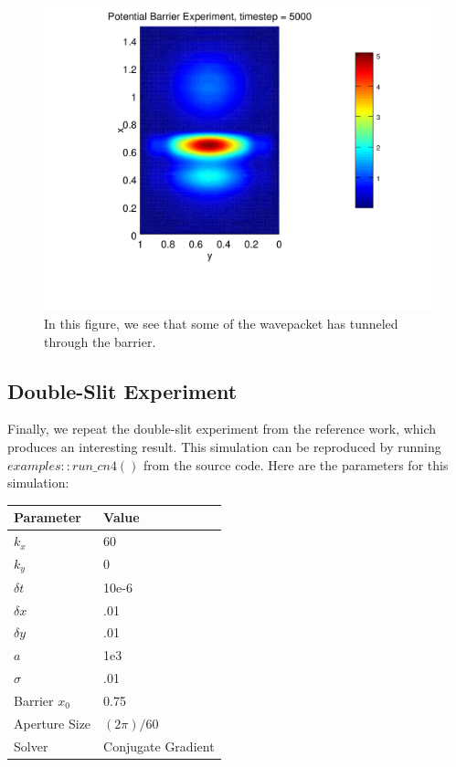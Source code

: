 \documentclass[letterpaper,12pt]{article}
\begin{document}
\begin{figure}[!htbp]
\centering
\includegraphics[scale=0.65,trim = 2mm 25mm 2mm 15mm]{barrier3.png}
\caption{In this figure, we see that some of the wavepacket has tunneled through the barrier.}
\label{fig:b3}
\end{figure}

\newpage
\subsection{Double-Slit Experiment}

Finally, we repeat the double-slit experiment from the reference work, which produces an interesting result.  This simulation can be reproduced by running $examples::run\_cn4()$ from the source code. Here are the parameters for this simulation:

\begin{center}
    \begin{tabular}{ | l | l  |}
    \hline
    Parameter & Value  \\ \hline
	$k_x$ & 60  \\ \hline
	$k_y$ & 0  \\ \hline    
	$\delta t$ & 10e-6  \\ \hline    
    $\delta x$ & .01  \\ \hline    
    $\delta y$ & .01  \\ \hline 
 	$a$ & 1e3  \\ \hline    
    $\sigma$ & .01  \\ \hline  
    Barrier $x_0$ & 0.75 \\ \hline            
	Aperture Size & $(2\pi)/60$ \\ \hline            
    Solver & Conjugate Gradient  \\ \hline            
    \hline
    \end{tabular}
\end{center}
\end{document}
